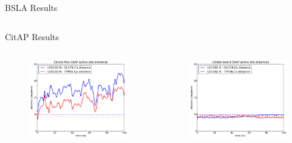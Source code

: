 \documentclass{beamer}
\begin{document}
\begin{frame}[t]
\begin{columns}[T,onlytextwidth]
\begin{column}{.48\linewidth}
{\begin{block}{BSLA Results}
\begin{columns}[t]
            \end{columns}  

        \end{block} 


        \begin{block}{CitAP Results}
        
            \begin{columns}[t]
                \begin{figure}
                    \includegraphics[width=1.0\textwidth]{figures/CitAP_opening/CitAP_dist_free.pdf}
                \end{figure}       

                \begin{figure}
                    \includegraphics[width=1.0\textwidth]{figures/CitAP_opening/CitAP_dist_bound.pdf}
                \end{figure}        


\end{columns}
\end{block}}
\end{column}
\end{columns}
\end{frame}
\end{document}
